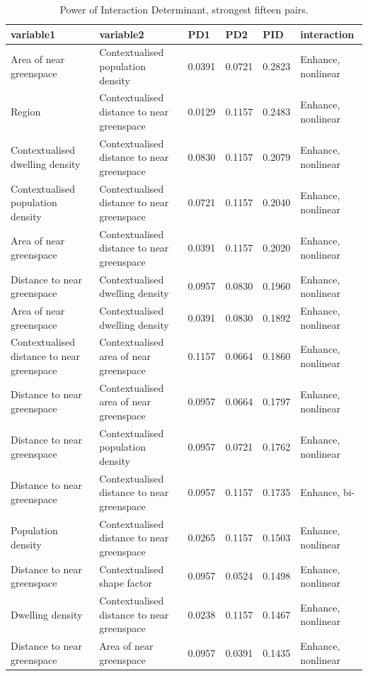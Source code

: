 \begin{table}[t]\centering
\caption{Power of Interaction Determinant, strongest fifteen pairs.}\label{tab:pid}
\begin{tabular}{llllll}
\hline
variable1 & variable2 & PD1 & PD2 & PID & interaction \\
\hline
Area of near greenspace & Contextualised population density & 0.0391 & 0.0721 & 0.2823 & Enhance, nonlinear \\
Region & Contextualised distance to near greenspace & 0.0129 & 0.1157 & 0.2483 & Enhance, nonlinear \\
Contextualised dwelling density & Contextualised distance to near greenspace & 0.0830 & 0.1157 & 0.2079 & Enhance, nonlinear \\
Contextualised population density & Contextualised distance to near greenspace & 0.0721 & 0.1157 & 0.2040 & Enhance, nonlinear \\
Area of near greenspace & Contextualised distance to near greenspace & 0.0391 & 0.1157 & 0.2020 & Enhance, nonlinear \\
Distance to near greenspace & Contextualised dwelling density & 0.0957 & 0.0830 & 0.1960 & Enhance, nonlinear \\
Area of near greenspace & Contextualised dwelling density & 0.0391 & 0.0830 & 0.1892 & Enhance, nonlinear \\
Contextualised distance to near greenspace & Contextualised area of near greenspace & 0.1157 & 0.0664 & 0.1860 & Enhance, nonlinear \\
Distance to near greenspace & Contextualised area of near greenspace & 0.0957 & 0.0664 & 0.1797 & Enhance, nonlinear \\
Distance to near greenspace & Contextualised population density & 0.0957 & 0.0721 & 0.1762 & Enhance, nonlinear \\
Distance to near greenspace & Contextualised distance to near greenspace & 0.0957 & 0.1157 & 0.1735 & Enhance, bi- \\
Population density & Contextualised distance to near greenspace & 0.0265 & 0.1157 & 0.1503 & Enhance, nonlinear \\
Distance to near greenspace & Contextualised shape factor & 0.0957 & 0.0524 & 0.1498 & Enhance, nonlinear \\
Dwelling density & Contextualised distance to near greenspace & 0.0238 & 0.1157 & 0.1467 & Enhance, nonlinear \\
Distance to near greenspace & Area of near greenspace & 0.0957 & 0.0391 & 0.1435 & Enhance, nonlinear \\
\hline
\end{tabular}\end{table}
